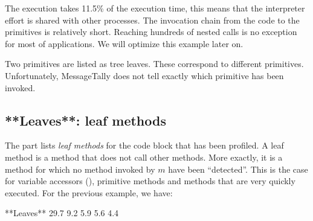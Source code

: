 \documentclass[a4paper,10pt,twoside]{book}
\begin{document}
The execution takes 11.5\% of the execution time, this means that the interpreter effort is shared with other processes. The invocation chain from the code to the primitives is relatively short. Reaching hundreds of nested calls is no exception for most of applications. We will optimize this example later on.

Two primitives are listed as tree leaves. These correspond to different primitives. Unfortunately, MessageTally does not tell exactly which primitive has been invoked.

\subsection{**Leaves**: leaf methods}

The  part lists \emph{leaf methods} for the code block that has been profiled. A leaf method is a method that does not call other methods. More exactly, it is a method  for which no method invoked by $m$ have been ``detected''. This is the case for variable accessors (\eg  {}), primitive methods and methods that are very quickly executed. For the previous example, we have:

\begin{code}

**Leaves**
29.7%
9.2%
5.9%
5.6%
4.4%
\end{code}
\end{document}
